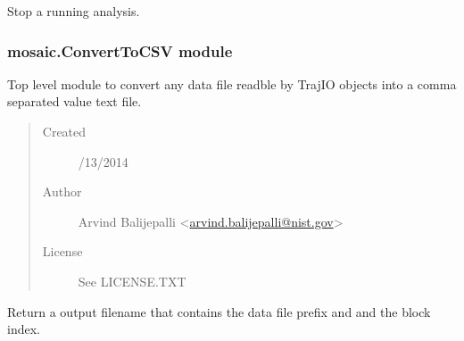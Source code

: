 \documentclass[letterpaper,10pt,english]{sphinxmanual}
\begin{document}
\begin{fulllineitems}
\begin{fulllineitems}
\begin{quote}
\begin{description}
\begin{itemize}
\end{itemize}

\end{description}\end{quote}

\end{fulllineitems}


\begin{fulllineitems}
\label{api-doc/mosaic:mosaic.SingleChannelAnalysis.SingleChannelAnalysis.Stop}
Stop a running analysis.

\end{fulllineitems}


\end{fulllineitems}



\subsubsection{mosaic.ConvertToCSV module}
\label{api-doc/mosaic:module-mosaic.ConvertToCSV}\label{api-doc/mosaic:mosaic-converttocsv-module}
Top level module to convert any data file readble by TrajIO objects into a comma separated value text file.
\begin{quote}\begin{description}
\item[{Created}] /13/2014

\item[{Author}] \leavevmode
Arvind Balijepalli \textless{}\href{mailto:arvind.balijepalli@nist.gov}{arvind.balijepalli@nist.gov}\textgreater{}

\item[{License}] \leavevmode
See LICENSE.TXT

\end{description}\end{quote}

\begin{fulllineitems}
\label{api-doc/mosaic:mosaic.ConvertToCSV.ConvertToCSV._filename}
Return a output filename that contains the data file prefix and and the block index.

\end{fulllineitems}
\end{document}

